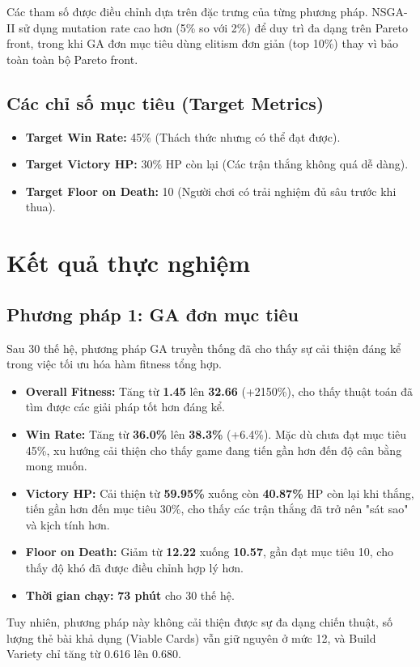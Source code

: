 Các tham số được điều chỉnh dựa trên đặc trưng của từng phương pháp. NSGA-II sử dụng mutation rate cao hơn (5\% so với 2\%) để duy trì đa dạng trên Pareto front, trong khi GA đơn mục tiêu dùng elitism đơn giản (top 10\%) thay vì bảo toàn toàn bộ Pareto front.

\subsection{Các chỉ số mục tiêu (Target Metrics)}
\begin{itemize}
    \item \textbf{Target Win Rate:} 45\% (Thách thức nhưng có thể đạt được).
    \item \textbf{Target Victory HP:} 30\% HP còn lại (Các trận thắng không quá dễ dàng).
    \item \textbf{Target Floor on Death:} 10 (Người chơi có trải nghiệm đủ sâu trước khi thua).
\end{itemize}

\section{Kết quả thực nghiệm}
\subsection{Phương pháp 1: GA đơn mục tiêu}
Sau 30 thế hệ, phương pháp GA truyền thống đã cho thấy sự cải thiện đáng kể trong việc tối ưu hóa hàm fitness tổng hợp.
\begin{itemize}
    \item \textbf{Overall Fitness:} Tăng từ \textbf{1.45} lên \textbf{32.66} (+2150\%), cho thấy thuật toán đã tìm được các giải pháp tốt hơn đáng kể.
    \item \textbf{Win Rate:} Tăng từ \textbf{36.0\%} lên \textbf{38.3\%} (+6.4\%). Mặc dù chưa đạt mục tiêu 45\%, xu hướng cải thiện cho thấy game đang tiến gần hơn đến độ cân bằng mong muốn.
    \item \textbf{Victory HP:} Cải thiện từ \textbf{59.95\%} xuống còn \textbf{40.87\%} HP còn lại khi thắng, tiến gần hơn đến mục tiêu 30\%, cho thấy các trận thắng đã trở nên "sát sao" và kịch tính hơn.
    \item \textbf{Floor on Death:} Giảm từ \textbf{12.22} xuống \textbf{10.57}, gần đạt mục tiêu 10, cho thấy độ khó đã được điều chỉnh hợp lý hơn.
    \item \textbf{Thời gian chạy:} \textbf{73 phút} cho 30 thế hệ.
\end{itemize}
Tuy nhiên, phương pháp này không cải thiện được sự đa dạng chiến thuật, số lượng thẻ bài khả dụng (Viable Cards) vẫn giữ nguyên ở mức 12, và Build Variety chỉ tăng từ 0.616 lên 0.680.

